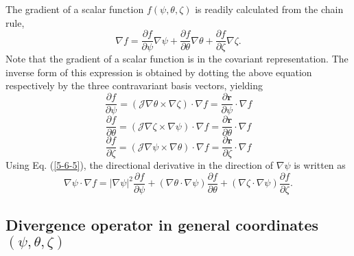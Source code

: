 \documentclass{llncs}
\begin{document}
The gradient of a scalar function $f (\psi, \theta, \zeta)$ is readily
calculated from the chain rule,
\begin{equation}
  \label{5-6-5} \nabla f = \frac{\partial f}{\partial \psi} \nabla \psi +
  \frac{\partial f}{\partial \theta} \nabla \theta + \frac{\partial
  f}{\partial \zeta} \nabla \zeta .
\end{equation}
Note that the gradient of a scalar function is in the covariant
representation. The inverse form of this expression is obtained by dotting the
above equation respectively by the three contravariant basis vectors, yielding
\begin{equation}
  \label{4-6-1} \frac{\partial f}{\partial \psi} = (\mathcal{J} \nabla \theta
  \times \nabla \zeta) \cdot \nabla f = \frac{\partial \mathbf{r}}{\partial
  \psi} \cdot \nabla f
\end{equation}
\begin{equation}
  \label{4-6-2} \frac{\partial f}{\partial \theta} = (\mathcal{J} \nabla \zeta
  \times \nabla \psi) \cdot \nabla f = \frac{\partial \mathbf{r}}{\partial
  \theta} \cdot \nabla f
\end{equation}
\begin{equation}
  \label{4-6-3} \frac{\partial f}{\partial \zeta} = (\mathcal{J} \nabla \psi
  \times \nabla \theta) \cdot \nabla f = \frac{\partial \mathbf{r}}{\partial
  \zeta} \cdot \nabla f
\end{equation}
Using Eq. (\ref{5-6-5}), the directional derivative in the direction of
$\nabla \psi$ is written as
\begin{equation}
  \nabla \psi \cdot \nabla f = | \nabla \psi |^2 \frac{\partial f}{\partial
  \psi} + (\nabla \theta \cdot \nabla \psi) \frac{\partial f}{\partial \theta}
  + (\nabla \zeta \cdot \nabla \psi) \frac{\partial f}{\partial \zeta} .
\end{equation}

\subsection{Divergence operator in general coordinates $(\psi, \theta,
\zeta)$}
\end{document}
